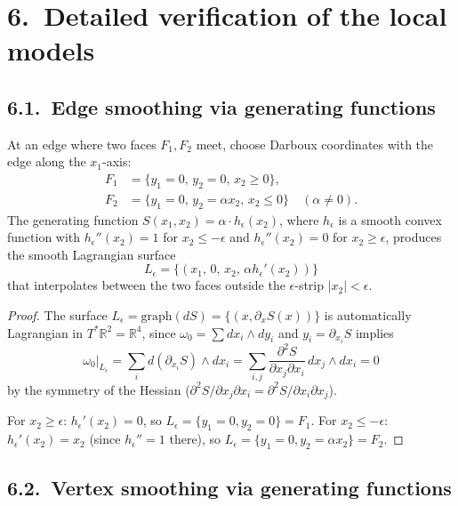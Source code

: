 \section*{6.\ Detailed verification of the local models}
\label{sec:p8-local}

\subsection*{6.1.\ Edge smoothing via generating functions}

\begin{lemma}
\label{lem:p8-edge-smooth}
At an edge where two faces $F_1, F_2$ meet, choose Darboux coordinates
with the edge along the $x_1$-axis:
\begin{align*}
F_1 &= \{y_1=0,\, y_2=0,\, x_2\ge 0\}, \\
F_2 &= \{y_1=0,\, y_2=\alpha x_2,\, x_2\le 0\} \quad (\alpha\ne 0).
\end{align*}
The generating function $S(x_1,x_2) = \alpha\cdot h_\epsilon(x_2)$, where
$h_\epsilon$ is a smooth convex function with $h_\epsilon''(x_2)=1$ for
$x_2\le -\epsilon$ and $h_\epsilon''(x_2)=0$ for $x_2\ge\epsilon$, produces
the smooth Lagrangian surface
\[
  L_\epsilon = \{(x_1,\, 0,\, x_2,\, \alpha h_\epsilon'(x_2))\}
\]
that interpolates between the two faces outside the $\epsilon$-strip
$|x_2|<\epsilon$.
\end{lemma}

\begin{proof}
The surface $L_\epsilon = \mathrm{graph}(dS) = \{(x, \partial_x S(x))\}$
is automatically Lagrangian in $T^*\mathbb{R}^2 = \mathbb{R}^4$, since
$\omega_0 = \sum dx_i\wedge dy_i$ and $y_i = \partial_{x_i} S$ implies
\[
  \omega_0|_{L_\epsilon}
  = \sum_i d(\partial_{x_i}S)\wedge dx_i
  = \sum_{i,j} \frac{\partial^2 S}{\partial x_j\partial x_i}\,dx_j\wedge dx_i
  = 0
\]
by the symmetry of the Hessian ($\partial^2 S/\partial x_j\partial x_i =
\partial^2 S/\partial x_i\partial x_j$).

For $x_2\ge\epsilon$: $h_\epsilon'(x_2)=0$, so $L_\epsilon = \{y_1=0,y_2=0\}
= F_1$. For $x_2\le -\epsilon$: $h_\epsilon'(x_2) = x_2$ (since
$h_\epsilon'' = 1$ there), so $L_\epsilon = \{y_1=0, y_2=\alpha x_2\} = F_2$.
\end{proof}

\subsection*{6.2.\ Vertex smoothing via generating functions}

